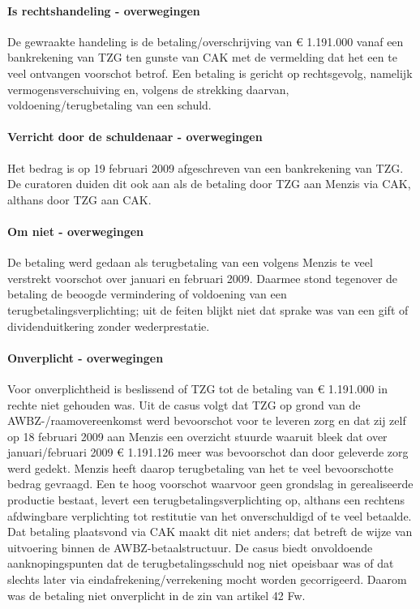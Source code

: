 \documentclass[
  dutch,
  a4paper,
]{article}
\begin{document}
\paragraph{Is rechtshandeling - overwegingen}\label{is-rechtshandeling---overwegingen-82}

De gewraakte handeling is de betaling/overschrijving van € 1.191.000 vanaf een bankrekening van TZG ten gunste van CAK met de vermelding dat het een te veel ontvangen voorschot betrof. Een betaling is gericht op rechtsgevolg, namelijk vermogensverschuiving en, volgens de strekking daarvan, voldoening/terugbetaling van een schuld.

\paragraph{Verricht door de schuldenaar - overwegingen}\label{verricht-door-de-schuldenaar---overwegingen-82}

Het bedrag is op 19 februari 2009 afgeschreven van een bankrekening van TZG. De curatoren duiden dit ook aan als de betaling door TZG aan Menzis via CAK, althans door TZG aan CAK.

\paragraph{Om niet - overwegingen}\label{om-niet---overwegingen-82}

De betaling werd gedaan als terugbetaling van een volgens Menzis te veel verstrekt voorschot over januari en februari 2009. Daarmee stond tegenover de betaling de beoogde vermindering of voldoening van een terugbetalingsverplichting; uit de feiten blijkt niet dat sprake was van een gift of dividenduitkering zonder wederprestatie.

\paragraph{Onverplicht - overwegingen}\label{onverplicht---overwegingen-82}

Voor onverplichtheid is beslissend of TZG tot de betaling van € 1.191.000 in rechte niet gehouden was. Uit de casus volgt dat TZG op grond van de AWBZ-/raamovereenkomst werd bevoorschot voor te leveren zorg en dat zij zelf op 18 februari 2009 aan Menzis een overzicht stuurde waaruit bleek dat over januari/februari 2009 € 1.191.126 meer was bevoorschot dan door geleverde zorg werd gedekt. Menzis heeft daarop terugbetaling van het te veel bevoorschotte bedrag gevraagd. Een te hoog voorschot waarvoor geen grondslag in gerealiseerde productie bestaat, levert een terugbetalingsverplichting op, althans een rechtens afdwingbare verplichting tot restitutie van het onverschuldigd of te veel betaalde. Dat betaling plaatsvond via CAK maakt dit niet anders; dat betreft de wijze van uitvoering binnen de AWBZ-betaalstructuur. De casus biedt onvoldoende aanknopingspunten dat de terugbetalingsschuld nog niet opeisbaar was of dat slechts later via eindafrekening/verrekening mocht worden gecorrigeerd. Daarom was de betaling niet onverplicht in de zin van artikel 42 Fw.
\end{document}
